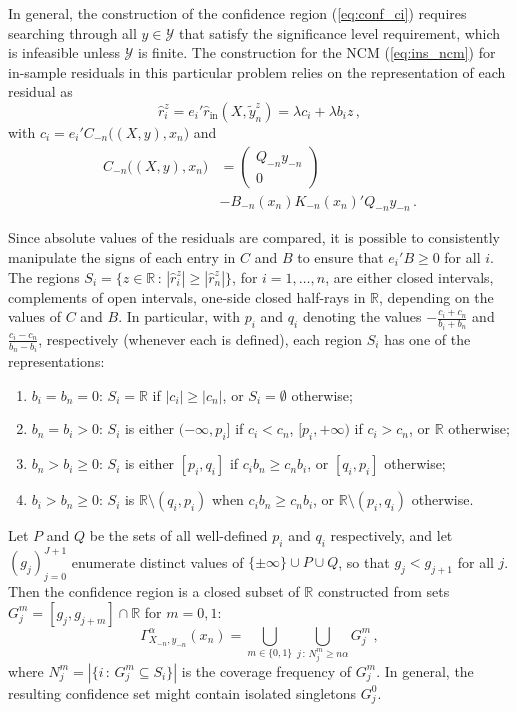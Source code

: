 \documentclass[a4paper,14pt]{extarticle}
\newcommand{\Ycal}{\mathcal{Y}}
\newcommand{\Real}{\mathbb{R}}
\begin{document}
In general, the construction of the confidence region (\ref{eq:conf_ci}) requires
searching through all $y\in \Ycal$ that satisfy the significance level requirement,
which is infeasible unless $\Ycal$ is finite. The construction for the NCM (\ref{eq:ins_ncm})
for in-sample residuals in this particular problem relies on the representation
of each residual as
\begin{equation*}
  \hat{r}_i^z
    = e_i' \hat{r}_{\text{in}}(X, \tilde{y}_n^z)
    = \lambda c_i + \lambda b_i z
    \,,
\end{equation*}
with $c_i = e_i' C_{-n}\bigl((X, y), x_n\bigr)$ and
\begin{align*}
  C_{-n}\bigl((X, y), x_n\bigr)
    &= \begin{pmatrix} Q_{-n} y_{-n} \\ 0 \end{pmatrix} \\
    &- B_{-n}(x_n) K_{-n}(x_n)' Q_{-n} y_{-n}
    \,.
\end{align*}

Since absolute values of the residuals are compared, it is possible to consistently
manipulate the signs of each entry in $C$ and $B$ to ensure that $e_i'B\geq 0$ for
all $i$. The regions $S_i = \{z\in\Real\,:\, |\hat{r}_i^z| \geq |\hat{r}_n^z|\}$, for
$i=1,\ldots, n$, are either closed intervals, complements of open intervals,
one-side closed half-rays in $\Real$, depending on the values of $C$ and $B$. In
particular, with $p_i$ and $q_i$ denoting the values $-\frac{c_i+c_n}{b_i+b_n}$ and
$\frac{c_i-c_n}{b_n-b_i}$, respectively (whenever each is defined), each region
$S_i$ has one of the representations:
\begin{enumerate}
  \item $b_i=b_n=0$: $S_i = \Real$ if $|c_i| \geq |c_n|$, or $S_i = \emptyset$
  otherwise;
  \item $b_n = b_i > 0$: $S_i$ is either $(-\infty, p_i]$ if $c_i < c_n$, $[p_i, +\infty)$ if
  $c_i > c_n$, or $\Real$ otherwise;
  \item $b_n > b_i \geq 0$: $S_i$ is either $[p_i, q_i]$ if $c_i b_n \geq c_n b_i$,
  or $[q_i, p_i]$ otherwise;
  \item $b_i > b_n \geq 0$: $S_i$ is $\Real\setminus (q_i, p_i)$ when $c_i b_n \geq c_n b_i$,
  or $\Real\setminus (p_i, q_i)$ otherwise.
\end{enumerate}
Let $P$ and $Q$ be the sets of all well-defined $p_i$ and $q_i$ respectively, and
let $(g_j)_{j=0}^{J+1}$ enumerate distinct values of $\{\pm\infty\} \cup P \cup Q$,
so that $g_j < g_{j+1}$ for all $j$. Then the confidence region is a closed subset
of $\Real$ constructed from sets $G^m_j = [g_j, g_{j+m}]\cap \Real$ for $m=0, 1$:
\begin{equation} \label{eq:rrcm_conf_ci}
  \Gamma_{X_{-n}, y_{-n}}^\alpha(x_n)
    = \bigcup_{m\in\{0,1\}} \bigcup_{j\,:\, N^m_j \geq n \alpha} G^m_j
    \,,
\end{equation}
where $N^m_j = |\{i \,:\, G^m_j \subseteq S_i\}|$ is the coverage frequency of $G^m_j$.
In general, the resulting confidence set might contain isolated singletons $G^0_j$.
\end{document}
